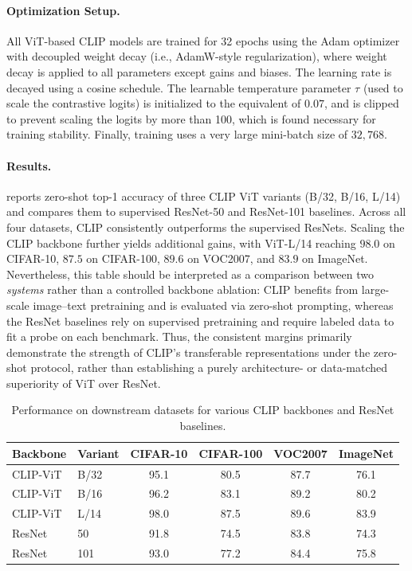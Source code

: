 \documentclass[../../book-main.tex]{subfiles}
\begin{document}
\paragraph{Optimization Setup.}
All ViT-based CLIP models are trained for 32 epochs using the Adam
optimizer with decoupled weight decay (i.e., AdamW-style
regularization), where weight decay is applied to all parameters
except gains and biases. The learning rate is decayed using a cosine
schedule. The learnable temperature parameter \(\tau\) (used to scale
the contrastive logits) is initialized to the equivalent of \(0.07\),
and is clipped to prevent scaling the logits by more than 100, which
is found necessary for training stability. Finally, training uses a
very large mini-batch size of \(32{,}768\).

\paragraph{Results.} reports zero-shot top-1
accuracy of three CLIP ViT variants (B/32, B/16, L/14) and compares
them to supervised ResNet-50 and ResNet-101 baselines.
Across all four datasets, CLIP consistently outperforms the supervised ResNets.
Scaling the CLIP backbone further yields additional gains, with
ViT-L/14 reaching \(98.0\) on CIFAR-10, \(87.5\) on CIFAR-100,
\(89.6\) on VOC2007, and \(83.9\) on ImageNet.
Nevertheless, this table should be interpreted as a comparison
between two \emph{systems} rather than a controlled backbone
ablation: CLIP benefits from large-scale image--text pretraining and
is evaluated via zero-shot prompting, whereas the ResNet baselines
rely on supervised pretraining and require labeled data to fit a
probe on each benchmark.
Thus, the consistent margins primarily demonstrate the strength of
CLIP's transferable representations under the zero-shot protocol,
rather than establishing a purely architecture- or data-matched
superiority of ViT over ResNet.

\begin{table}[t]
\centering
\begin{tabular}{@{}llcccc@{}}
    \toprule
    Backbone & Variant & CIFAR-10 & CIFAR-100 & VOC2007 & ImageNet \\
    \midrule
    CLIP-ViT & B/32 & 95.1 & 80.5 & 87.7 & 76.1 \\
    CLIP-ViT & B/16 & 96.2 & 83.1 & 89.2 & 80.2 \\
    CLIP-ViT & L/14 & 98.0 & 87.5 & 89.6 & 83.9 \\
    \midrule
    ResNet & 50  & 91.8 & 74.5 & 83.8 & 74.3 \\
    ResNet & 101 & 93.0 & 77.2 & 84.4 & 75.8 \\
    \bottomrule
\end{tabular}
\caption{Performance on downstream datasets for various CLIP
backbones and ResNet baselines.}
\label{tab:clip_vs_resnet}
\end{table}
\end{document}
